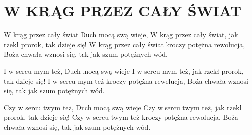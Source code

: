 \documentclass[../../../songbook.tex]{subfiles}
\begin{document}
\TabPositions{9cm} %
\section*{W KRĄG PRZEZ CAŁY ŚWIAT}
{}
\vspace{0.5cm}
W krąg przez cały świat Duch mocą swą wieje,	     \newline	 
W krąg przez cały świat, jak rzekł prorok, tak dzieje się!     \newline	 
W krąg przez cały świat kroczy potężna rewolucja,		     \newline	 
Boża chwała wznosi się, tak jak szum potężnych wód.	     \newline	 

I w sercu mym też, Duch mocą swą wieje \newline
I w sercu mym też, jak rzekł prorok, tak dzieje się! \newline
I w sercu mym też kroczy potężna rewolucja, \newline
Boża chwała wznosi się, tak jak szum potężnych wód. \newline

Czy w sercu twym też, Duch mocą swą wieje \newline
Czy w sercu twym też, jak rzekł prorok, tak dzieje się! \newline
Czy w sercu twym też kroczy potężna rewolucja, \newline
Boża chwała wznosi się, tak jak szum potężnych wód. \newline
\end{document}
